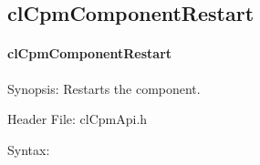 {\subsection{clCpmComponentRestart}
\hypertarget{pagecpm128}{}\paragraph{cl\-Cpm\-Component\-Restart}\label{pagecpm128}
\begin{Desc}
\item[Synopsis:]Restarts the component.\end{Desc}
\begin{Desc}
\item[Header File:]clCpmApi.h\end{Desc}
\begin{Desc}
\item[Syntax:]


\end{Desc}}
